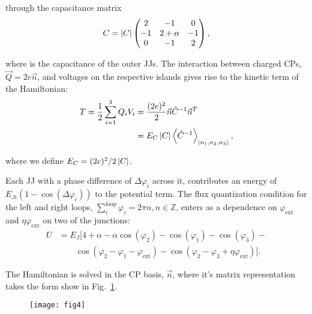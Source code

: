 \noindent through the capacitance matrix
\begin{equation}
  \label{eq:capac}
  C = \left|C\right| \begin{pmatrix}
    2  &  -1  &  0\\
    -1  &  2  +  \alpha  &  -1\\
    0  &  -1  & 2
  \end{pmatrix},
\end{equation}

\noindent where   is the capacitance  of the outer JJs.   The interaction
between  charged CPs,  $  \vec{Q}=2e\vec{n}  $, and  voltages  on the  respective
islands gives rise to the kinetic term of the Hamiltonian:
\begin{equation}\label{eq:kinetic}
  \begin{aligned}
    T = \frac{1}{2}\sum_{i=1}^{3}Q_iV_i & =
    \frac{(2e)^2}{2}\vec{n}\hat{C}^{-1}\vec{n}^{T}\\
    & = E_C \left|C\right| \left\langle \hat{C}^{-1} \right\rangle_{\Ket{n_{1}, n_2, n_3}},
  \end{aligned}
\end{equation}

\noindent where we define $ E_{C}={(2e)^{2}}/{2 \left|C\right| } $.

Each JJ with a  phase difference of $\Delta\varphi_{i}$ across it,  contributes an energy of
$  E_{Ji}\left(1  -  \cos(\Delta\varphi_i)\right)  $   to  the  potential  term.   The  flux
quantization     condition     for     the      left     and     right     loops,
$ \sum_{i}^{\text{loop}}  \varphi_i =  2\pi n, n  \in \mathbb{Z}$, enters  as a  dependence on
$ \varphi_\text{ext} $ and $ \eta\varphi_\text{ext} $ on two of the junctions:
\begin{equation}\label{eq:potential}
  \begin{aligned}
    U & = E_J\big[4 + \alpha - \alpha\cos(\varphi_{2}) -\cos(\varphi_{1}) -\cos(\varphi_{3}) - \\
    &  \qquad   \cos(\varphi_{2}  -  \varphi_{1}  -   \varphi_{\text{ext}})  -  \cos(\varphi_{2}  -   \varphi_{3}  +
    \eta\varphi_{\text{ext}})\big].
  \end{aligned}
\end{equation}

The  Hamiltonian  is solved  in  the  CP basis,  $\vec{n}  $,  where it's  matrix
representation takes the form show in Fig.~\ref{fig:matrix_representation}.

\begin{figure}[ht]
  \centering \texttt{[image: fig4]}
  \caption{\small \label{fig:matrix_representation} }
\end{figure}


